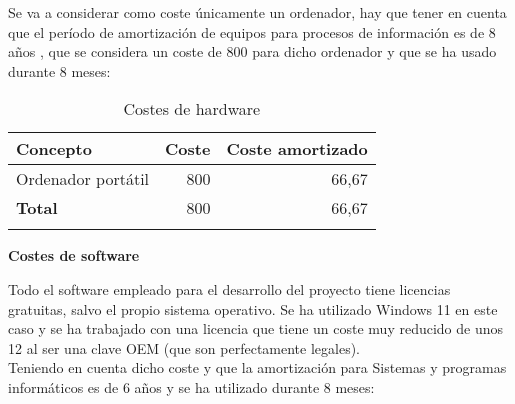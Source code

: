 Se va a considerar como coste únicamente un ordenador, hay que tener en cuenta que el período de amortización de equipos para procesos de información es de 8 años \cite{agencia_tributaria_tabla_2022}, que se considera un coste de 800 \officialeuro \thinspace para dicho ordenador y que se ha usado durante 8 meses:

\begin{longtable}[]{@{}lrr@{}}
	\toprule
	\begin{minipage}[b]{0.29\columnwidth}\raggedright\strut
		\textbf{Concepto}\strut
	\end{minipage} & \begin{minipage}[b]{0.18\columnwidth}\raggedright\strut
		\textbf{Coste}\strut
	\end{minipage} & \begin{minipage}[b]{0.32\columnwidth}\raggedright\strut
		\textbf{Coste amortizado}\strut
	\end{minipage}\tabularnewline
	\midrule
	\endhead
	\begin{minipage}[t]{0.29\columnwidth}\raggedright\strut
		Ordenador portátil\strut
	\end{minipage} & \begin{minipage}[t]{0.18\columnwidth}\raggedright\strut
		800 \officialeuro\strut
	\end{minipage} & \begin{minipage}[t]{0.32\columnwidth}\raggedright\strut
		66,67 \officialeuro\strut
	\end{minipage}\tabularnewline
	\midrule
	\begin{minipage}[t]{0.29\columnwidth}\raggedright\strut
		\textbf{Total}\strut
	\end{minipage} & \begin{minipage}[t]{0.18\columnwidth}\raggedright\strut
		800 \officialeuro\strut
	\end{minipage} & \begin{minipage}[t]{0.32\columnwidth}\raggedright\strut
		66,67 \officialeuro\strut
	\end{minipage}\tabularnewline
	\bottomrule
	\caption{Costes de hardware}
\end{longtable}

\textbf{Costes de software}

Todo el software empleado para el desarrollo del proyecto tiene licencias gratuitas, salvo el propio sistema operativo. Se ha utilizado Windows 11 en este caso y se ha trabajado con una licencia que tiene un coste muy reducido de unos 12 \officialeuro al ser una clave OEM (que son perfectamente legales).\\
Teniendo en cuenta dicho coste y que la amortización para Sistemas y programas informáticos es de 6 años \cite{agencia_tributaria_tabla_2022} y se ha utilizado durante 8 meses:


